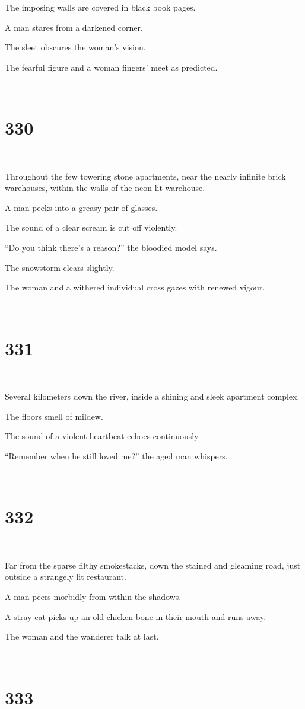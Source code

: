 \documentclass{report}
\begin{document}
The imposing walls are covered in black book pages.

A man stares from a darkened corner.

The sleet obscures the woman's vision.

The fearful figure and a woman fingers' meet as predicted.

~
\chapter*{330}
~

Throughout the few towering stone apartments, near the nearly infinite brick warehouses, within the walls of the neon lit warehouse.

A man peeks into a greasy pair of glasses.

The sound of a clear scream is cut off violently.

``Do you think there's a reason?'' the bloodied model says.

The snowstorm clears slightly.

The woman and a withered individual cross gazes with renewed vigour.

~
\chapter*{331}
~

Several kilometers down the river, inside a shining and sleek apartment complex.

The floors smell of mildew.

The sound of a violent heartbeat echoes continuously.

``Remember when he still loved me?'' the aged man whispers.

~
\chapter*{332}
~

Far from the sparse filthy smokestacks, down the stained and gleaming road, just outside a strangely lit restaurant.

A man peers morbidly from within the shadows.

A stray cat picks up an old chicken bone in their mouth and runs away.

The woman and the wanderer talk at last.

~
\chapter*{333}
~
\end{document}
